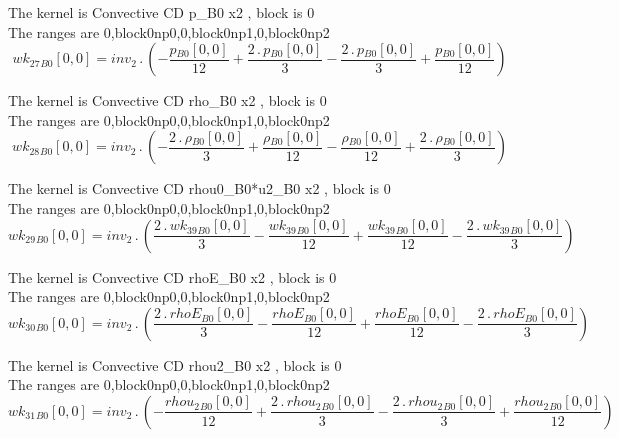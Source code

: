\documentclass{article}
\begin{document}
\noindent The kernel is Convective CD p_B0 x2 , block is 0\\\noindent The ranges are 0,block0np0,0,block0np1,0,block0np2\\\begin{dmath}{wk_{27}{_{B0}}}[{0,0}] = inv_2 \,.\, \left(- \frac{{p{_{B0}}}[{0,0}]}{12} + \frac{2 \,.\, {p{_{B0}}}[{0,0}]}{3} - \frac{2 \,.\, {p{_{B0}}}[{0,0}]}{3} + \frac{{p{_{B0}}}[{0,0}]}{12}\right)\end{dmath}

\noindent The kernel is Convective CD rho_B0 x2 , block is 0\\\noindent The ranges are 0,block0np0,0,block0np1,0,block0np2\\\begin{dmath}{wk_{28}{_{B0}}}[{0,0}] = inv_2 \,.\, \left(- \frac{2 \,.\, {\rho{_{B0}}}[{0,0}]}{3} + \frac{{\rho{_{B0}}}[{0,0}]}{12} - \frac{{\rho{_{B0}}}[{0,0}]}{12} + \frac{2 \,.\, {\rho{_{B0}}}[{0,0}]}{3}\right)\end{dmath}

\noindent The kernel is Convective CD rhou0_B0*u2_B0 x2 , block is 0\\\noindent The ranges are 0,block0np0,0,block0np1,0,block0np2\\\begin{dmath}{wk_{29}{_{B0}}}[{0,0}] = inv_2 \,.\, \left(\frac{2 \,.\, {wk_{39}{_{B0}}}[{0,0}]}{3} - \frac{{wk_{39}{_{B0}}}[{0,0}]}{12} + \frac{{wk_{39}{_{B0}}}[{0,0}]}{12} - \frac{2 \,.\, {wk_{39}{_{B0}}}[{0,0}]}{3}\right)\end{dmath}

\noindent The kernel is Convective CD rhoE_B0 x2 , block is 0\\\noindent The ranges are 0,block0np0,0,block0np1,0,block0np2\\\begin{dmath}{wk_{30}{_{B0}}}[{0,0}] = inv_2 \,.\, \left(\frac{2 \,.\, {rhoE{_{B0}}}[{0,0}]}{3} - \frac{{rhoE{_{B0}}}[{0,0}]}{12} + \frac{{rhoE{_{B0}}}[{0,0}]}{12} - \frac{2 \,.\, {rhoE{_{B0}}}[{0,0}]}{3}\right)\end{dmath}

\noindent The kernel is Convective CD rhou2_B0 x2 , block is 0\\\noindent The ranges are 0,block0np0,0,block0np1,0,block0np2\\\begin{dmath}{wk_{31}{_{B0}}}[{0,0}] = inv_2 \,.\, \left(- \frac{{rhou_{2}{_{B0}}}[{0,0}]}{12} + \frac{2 \,.\, {rhou_{2}{_{B0}}}[{0,0}]}{3} - \frac{2 \,.\, {rhou_{2}{_{B0}}}[{0,0}]}{3} + \frac{{rhou_{2}{_{B0}}}[{0,0}]}{12}\right)\end{dmath}
\end{document}
